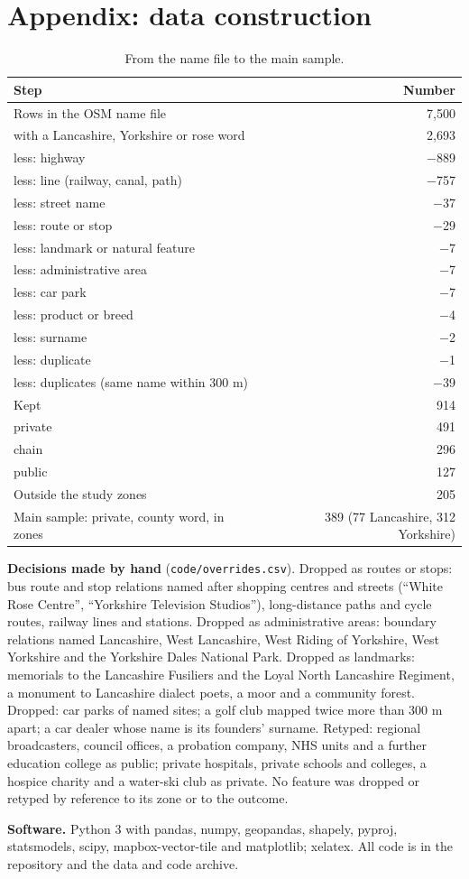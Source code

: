 \documentclass[11pt,a4paper]{article}
\begin{document}
\appendix
\section{Appendix: data construction}
\begin{table}[tbp]\centering\small\caption{From the name file to the main sample.}\label{tab:flow}\begin{tabular}{lr}\toprule Step & Number\\\midrule
Rows in the OSM name file & 7,500\\
with a Lancashire, Yorkshire or rose word & 2,693\\
\quad less: highway & $-$889\\
\quad less: line (railway, canal, path) & $-$757\\
\quad less: street name & $-$37\\
\quad less: route or stop & $-$29\\
\quad less: landmark or natural feature & $-$7\\
\quad less: administrative area & $-$7\\
\quad less: car park & $-$7\\
\quad less: product or breed & $-$4\\
\quad less: surname & $-$2\\
\quad less: duplicate & $-$1\\
\quad less: duplicates (same name within 300 m) & $-$39\\\midrule
Kept & 914\\
\quad private & 491\\
\quad chain & 296\\
\quad public & 127\\
Outside the study zones & 205\\
Main sample: private, county word, in zones & 389 (77 Lancashire, 312 Yorkshire)\\
\bottomrule\end{tabular}\end{table}

\textbf{Decisions made by hand} (\texttt{code/overrides.csv}). Dropped as routes or stops: bus route and stop relations named after shopping centres and streets (``White Rose Centre'', ``Yorkshire Television Studios''), long-distance paths and cycle routes, railway lines and stations. Dropped as administrative areas: boundary relations named Lancashire, West Lancashire, West Riding of Yorkshire, West Yorkshire and the Yorkshire Dales National Park. Dropped as landmarks: memorials to the Lancashire Fusiliers and the Loyal North Lancashire Regiment, a monument to Lancashire dialect poets, a moor and a community forest. Dropped: car parks of named sites; a golf club mapped twice more than 300 m apart; a car dealer whose name is its founders' surname. Retyped: regional broadcasters, council offices, a probation company, NHS units and a further education college as public; private hospitals, private schools and colleges, a hospice charity and a water-ski club as private. No feature was dropped or retyped by reference to its zone or to the outcome.

\textbf{Software.} Python 3 with pandas, numpy, geopandas, shapely, pyproj, statsmodels, scipy, mapbox-vector-tile and matplotlib; xelatex. All code is in the repository and the data and code archive.
\end{document}
